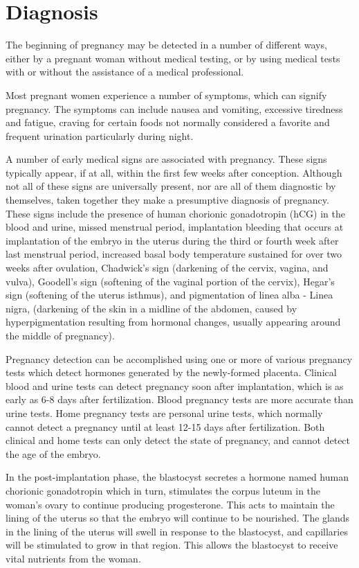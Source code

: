 \documentclass[12pt,a4paper,onecolumn]{article}
\begin{document}
\section{Diagnosis}

The beginning of pregnancy may be detected in a number of different ways, either by a pregnant woman
without medical testing, or by using medical tests with or without the assistance of a medical
professional.

Most pregnant women experience a number of symptoms, which can signify pregnancy. The symptoms can
include nausea and vomiting, excessive tiredness and fatigue, craving for certain foods not normally
considered a favorite and frequent urination particularly during night.

A number of early medical signs are associated with pregnancy. These signs typically appear, if at
all, within the first few weeks after conception. Although not all of these signs are universally
present, nor are all of them diagnostic by themselves, taken together they make a presumptive
diagnosis of pregnancy. These signs include the presence of human chorionic gonadotropin (hCG) in
the blood and urine, missed menstrual period, implantation bleeding that occurs at implantation of
the embryo in the uterus during the third or fourth week after last menstrual period, increased
basal body temperature sustained for over two weeks after ovulation, Chadwick's sign (darkening of
the cervix, vagina, and vulva), Goodell's sign (softening of the vaginal portion of the cervix),
Hegar's sign (softening of the uterus isthmus), and pigmentation of linea alba - Linea nigra,
(darkening of the skin in a midline of the abdomen, caused by hyperpigmentation resulting from
hormonal changes, usually appearing around the middle of pregnancy).

Pregnancy detection can be accomplished using one or more of various pregnancy tests which detect
hormones generated by the newly-formed placenta. Clinical blood and urine tests can detect pregnancy
soon after implantation, which is as early as 6-8 days after fertilization. Blood pregnancy tests
are more accurate than urine tests. Home pregnancy tests are personal urine tests, which normally
cannot detect a pregnancy until at least 12-15 days after fertilization. Both clinical and home
tests can only detect the state of pregnancy, and cannot detect the age of the embryo.

In the post-implantation phase, the blastocyst secretes a hormone named human chorionic gonadotropin
which in turn, stimulates the corpus luteum in the woman's ovary to continue producing progesterone.
This acts to maintain the lining of the uterus so that the embryo will continue to be nourished. The
glands in the lining of the uterus will swell in response to the blastocyst, and capillaries will be
stimulated to grow in that region. This allows the blastocyst to receive vital nutrients from the
woman.
\end{document}

